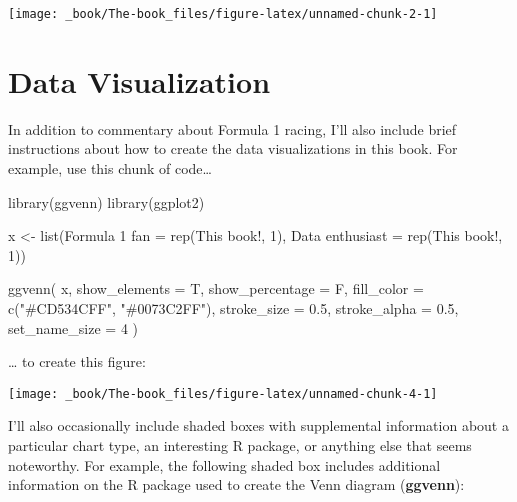 \documentclass[
]{book}
\newenvironment{Shaded}{\begin{snugshade}}{\end{snugshade}}
\newcommand{\AttributeTok}[1]{\textcolor[rgb]{0.77,0.63,0.00}{#1}}
\newcommand{\DecValTok}[1]{\textcolor[rgb]{0.00,0.00,0.81}{#1}}
\newcommand{\FloatTok}[1]{\textcolor[rgb]{0.00,0.00,0.81}{#1}}
\newcommand{\FunctionTok}[1]{\textcolor[rgb]{0.00,0.00,0.00}{#1}}
\newcommand{\NormalTok}[1]{#1}
\newcommand{\OtherTok}[1]{\textcolor[rgb]{0.56,0.35,0.01}{#1}}
\newcommand{\StringTok}[1]{\textcolor[rgb]{0.31,0.60,0.02}{#1}}
\begin{document}
\begin{center}\texttt{[image: \_book/The-book\_files/figure-latex/unnamed-chunk-2-1]} \end{center}

\hypertarget{data-visualization}{%
\section{Data Visualization}\label{data-visualization}}

In addition to commentary about Formula 1 racing, I'll also include brief instructions about how to create the data visualizations in this book. For example, use this chunk of code\ldots{}

\begin{Shaded}
\begin{Highlighting}[]
\FunctionTok{library}\NormalTok{(ggvenn)}
\FunctionTok{library}\NormalTok{(ggplot2)}

\NormalTok{x }\OtherTok{\textless{}{-}} \FunctionTok{list}\NormalTok{(}\StringTok{\textasciigrave{}}\AttributeTok{Formula 1 fan}\StringTok{\textasciigrave{}} \OtherTok{=} \FunctionTok{rep}\NormalTok{(}\StringTok{\textquotesingle{}This book!\textquotesingle{}}\NormalTok{, }\DecValTok{1}\NormalTok{),}
          \StringTok{\textasciigrave{}}\AttributeTok{Data enthusiast}\StringTok{\textasciigrave{}} \OtherTok{=} \FunctionTok{rep}\NormalTok{(}\StringTok{\textquotesingle{}This book!\textquotesingle{}}\NormalTok{, }\DecValTok{1}\NormalTok{))}


\FunctionTok{ggvenn}\NormalTok{(}
\NormalTok{  x, }
  \AttributeTok{show\_elements =}\NormalTok{ T,}
  \AttributeTok{show\_percentage =}\NormalTok{ F,}
  \AttributeTok{fill\_color =} \FunctionTok{c}\NormalTok{(}\StringTok{"\#CD534CFF"}\NormalTok{, }\StringTok{"\#0073C2FF"}\NormalTok{),}
  \AttributeTok{stroke\_size =} \FloatTok{0.5}\NormalTok{, }\AttributeTok{stroke\_alpha =} \FloatTok{0.5}\NormalTok{, }\AttributeTok{set\_name\_size =} \DecValTok{4}
\NormalTok{  )}
\end{Highlighting}
\end{Shaded}

\ldots{} to create this figure:

\begin{center}\texttt{[image: \_book/The-book\_files/figure-latex/unnamed-chunk-4-1]} \end{center}

I'll also occasionally include shaded boxes with supplemental information about a particular chart type, an interesting R package, or anything else that seems noteworthy. For example, the following shaded box includes additional information on the R package used to create the Venn diagram (\textbf{ggvenn}):
\end{document}
